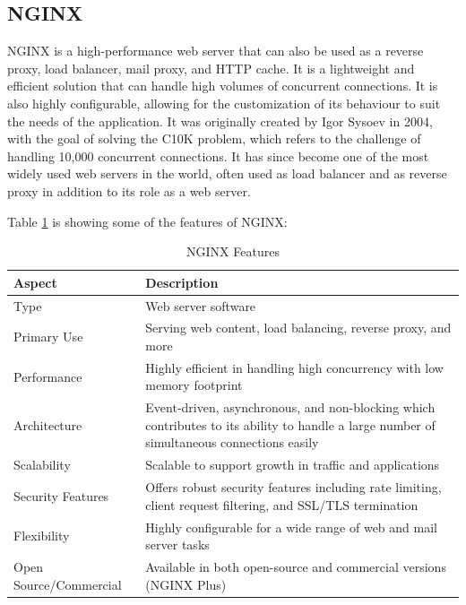 \subsection{NGINX}
NGINX is a high-performance web server that can also be used as a reverse proxy, load balancer, mail proxy, and HTTP cache. It is a lightweight and efficient solution that can handle high volumes of concurrent connections. It is also highly configurable, allowing for the customization of its behaviour to suit the needs of the application.
It was originally created by Igor Sysoev in 2004, with the goal of solving the C10K problem, which refers to the challenge of handling 10,000 concurrent connections. \cite{nginx} It has since become one of the most widely used web servers in the world, often used as load balancer and as reverse proxy in addition to its role as a web server.

Table \ref{tab:ngnix} is showing some of the features of NGINX\cite{nginx}:

\begin{table}[H]
    \centering
    \begin{tabularx}{\textwidth}{|X|X|}
        \hline
    \textbf{Aspect} & \textbf{Description} \\
    \hline
    Type & Web server software \\
    \hline
    Primary Use & Serving web content, load balancing, reverse proxy, and more \\
    \hline
    Performance & Highly efficient in handling high concurrency with low memory footprint \\
    \hline
    Architecture & Event-driven, asynchronous, and non-blocking which contributes to its ability to handle a large number of simultaneous connections easily \\
    \hline
    Scalability & Scalable to support growth in traffic and applications \\
    \hline
    Security Features & Offers robust security features including rate limiting, client request filtering, and SSL/TLS termination \\
    \hline
    Flexibility & Highly configurable for a wide range of web and mail server tasks \\
    \hline
    Open Source/Commercial & Available in both open-source and commercial versions (NGINX Plus) \\
    \hline
\end{tabularx}
\label{tab:ngnix}
\caption{NGINX Features}
\end{table}

